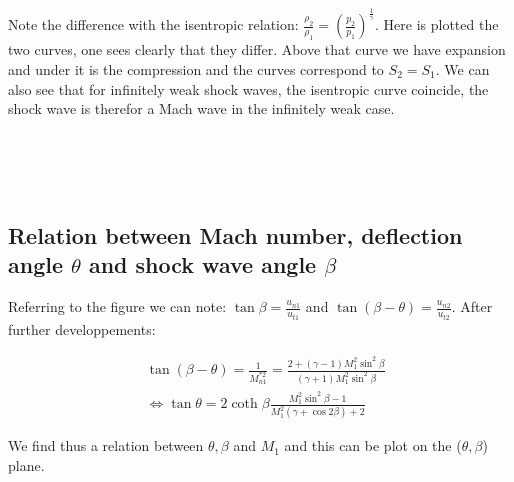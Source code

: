 	\ \\\\\\\\\\
	
	\begin{center}
	\end{center}
	
	Note the difference with the isentropic relation: $\frac{\rho _2 }{\rho _1} = \left(\frac{p_2}{p_1} \right)^{\frac{1}{\gamma}}$. Here is plotted the two curves, one sees clearly that they differ. Above that curve we have expansion and under it is the compression and the curves correspond to $S_2=S_1$. We can also see that for infinitely weak shock waves, the isentropic curve coincide, the shock wave is therefor a Mach wave in the infinitely weak case. 
	
	\ \\\\\\
	
\subsection{Relation between Mach number, deflection angle $\theta$ and shock wave angle $\beta$}
	Referring to the figure we can note: $\tan \beta = \frac{u_{n1}}{u_{t1}}$ and $\tan (\beta - \theta ) = \frac{u_{n2}}{u_{t2}}$. After further developpements: 
	
	\begin{equation}
	\begin{aligned}
	&\tan (\beta - \theta) = \frac{1}{M^{*2}_{n1}} = \frac{2 + (\gamma -1 )M_1^2\sin ^2 \beta }{(\gamma  +1) M_1^2\sin ^2 \beta}\\
	&\Leftrightarrow \tan \theta = 2 \coth \beta \frac{M_1^2\sin ^2 \beta -1}{M_1^2 (\gamma + \cos 2\beta ) +2}
	\end{aligned}	
	\end{equation}
	
	We find thus a relation between $\theta, \beta$ and $M_1$ and this can be plot on the ($\theta, \beta$) plane.
	
